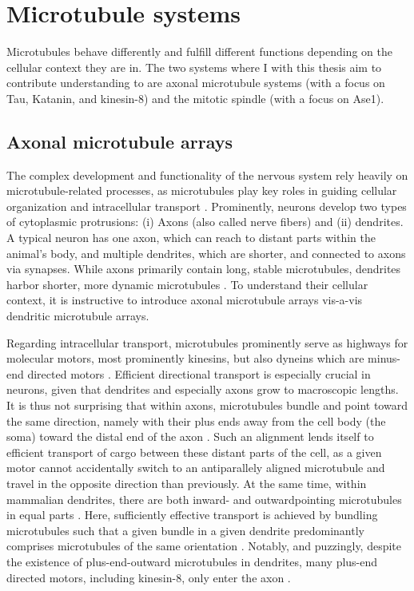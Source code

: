 \section{Microtubule systems}
Microtubules behave differently and fulfill different functions depending on the cellular context they are in. The two systems where I with this thesis aim to contribute understanding to are axonal microtubule systems (with a focus on Tau, Katanin, and kinesin-8) and the mitotic spindle (with a focus on Ase1).

\subsection{Axonal microtubule arrays}
\label{sec:neuron}
The complex development and functionality of the nervous system rely heavily on microtubule-related processes, as microtubules play key roles in guiding cellular organization and intracellular transport \parencite{Kapitein2015}. Prominently, neurons develop two types of cytoplasmic protrusions: (i) Axons (also called nerve fibers) and (ii) dendrites. A typical neuron has one axon, which can reach to distant parts within the animal's body, and multiple dendrites, which are shorter, and connected to axons via synapses. While axons primarily contain long, stable microtubules, dendrites harbor shorter, more dynamic microtubules \parencite{Tas2017}. To understand their cellular context, it is instructive to introduce axonal microtubule arrays vis-a-vis dendritic microtubule arrays.\par

Regarding intracellular transport, microtubules prominently serve as highways for molecular motors, most prominently kinesins, but also dyneins which are minus-end directed motors \parencite{Kapitein2015}. Efficient directional transport is especially crucial in neurons, given that dendrites and especially axons grow to macroscopic lengths. It is thus not surprising that within axons, microtubules bundle and point toward the same direction, namely with their plus ends away from the cell body (the soma) toward the distal end of the axon \parencite{Tas2017}. Such an alignment lends itself to efficient transport of cargo between these distant parts of the cell, as a given motor cannot accidentally switch to an antiparallely aligned microtubule and travel in the opposite direction than previously. At the same time, within mammalian dendrites, there are both inward- and outwardpointing microtubules in equal parts \parencite{Tas2017}. Here, sufficiently effective transport is achieved by bundling microtubules such that a given bundle in a given dendrite predominantly comprises microtubules of the same orientation \parencite{Tas2017}. Notably, and puzzingly, despite the existence of plus-end-outward microtubules in dendrites, many plus-end directed motors, including kinesin-8, only enter the axon \parencite{Lipka2016}.\par

